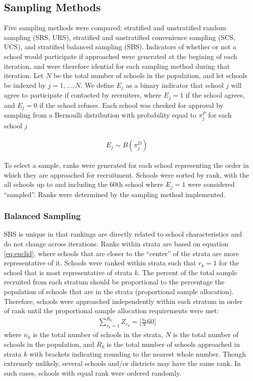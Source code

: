 \documentclass[man,floatsintext]{apa6}
\begin{document}
\hypertarget{sampling-methods}{%
\subsection{Sampling Methods}\label{sampling-methods}}

Five sampling methods were compared: stratified and unstratified random sampling (SRS, URS), stratified and unstratified convenience sampling (SCS, UCS), and stratified balanced sampling (SBS). Indicators of whether or not a school would participate if approached were generated at the begining of each iteration, and were therefore idential for each sampling method during that iteration. Let \(N\) be the total number of schools in the population, and let schools be indexed by \(j = 1, ..., N\). We define \(E_j\) as a binary indicator that school \(j\) will agree to participate if contacted by recruiters, where \(E_j = 1\) if the school agrees, and \(E_j = 0\) if the school refuses. Each school was checked for approval by sampling from a Bernoulli distribution with probability equal to \(\pi^P_j\) for each school \(j\)

\begin{align} \label{eq:Ej}
  E_j \sim B(\pi^D_j)
\end{align}

To select a sample, ranks were generated for each school representing the order in which they are approached for recruitment. Schools were sorted by rank, with the all schools up to and including the 60th school where \(E_j = 1\) were considered \enquote{sampled}. Ranks were determined by the sampling method implemented.

\hypertarget{balanced-sampling}{%
\subsubsection{Balanced Sampling}\label{balanced-sampling}}

SBS is unique in that rankings are directly related to school characteristics and do not change across iterations. Ranks within strata are based on equation \eqref{eq:euclid}, where schools that are closer to the \enquote{center} of the strata are more representative of it. Schools were ranked within strata such that \(r_k= 1\) for the school that is most representative of strata \(k\). The percent of the total sample recruited from each stratum should be proportional to the percentage the population of schools that are in the strata (proportional sample allocation). Therefore, schools were approached independently within each stratum in order of rank until the proportional sample allocation requirements were met:
\begin{align} \label{eq:rankCASS}
  \sum_{r_{k}=1}^{R_k}{Z_{r_k} = [\frac{n_k}{N}60}]
\end{align}
where \(n_k\) is the total number of schools in the strata, \(N\) is the total number of schools in the population, and \(R_k\) is the total number of schools approached in strata \(k\) with brackets indicating rounding to the nearest whole number. Though extremely unlikely, several schools and/or districts may have the same rank. In such cases, schools with equal rank were ordered randomly.
\end{document}

